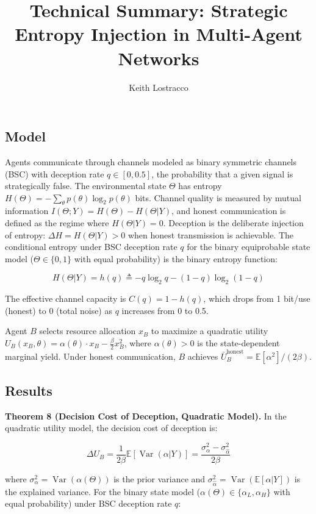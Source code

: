 \documentclass[11pt]{article}
\title{Technical Summary: Strategic Entropy Injection in Multi-Agent
Networks}
\author{Keith Lostracco}
\date{}
\begin{document}
\maketitle

\subsection{Model}\label{model}

Agents communicate through channels modeled as binary symmetric channels
(BSC) with deception rate \(q \in [0, 0.5]\), the probability that a
given signal is strategically false. The environmental state \(\Theta\)
has entropy \(H(\Theta) = -\sum_{\theta} p(\theta) \log_2 p(\theta)\)
bits. Channel quality is measured by mutual information
\(I(\Theta; Y) = H(\Theta) - H(\Theta | Y)\), and honest communication
is defined as the regime where \(H(\Theta | Y) = 0\). Deception is the
deliberate injection of entropy: \(\Delta H = H(\Theta | Y) > 0\) when
honest transmission is achievable. The conditional entropy under BSC
deception rate \(q\) for the binary equiprobable state model
(\(\Theta \in \{0,1\}\) with equal probability) is the binary entropy
function:

\[H(\Theta | Y) = h(q) \triangleq -q \log_2 q - (1 - q) \log_2(1 - q)\]

The effective channel capacity is \(C(q) = 1 - h(q)\), which drops from
1 bit/use (honest) to 0 (total noise) as \(q\) increases from 0 to 0.5.

Agent \(B\) selects resource allocation \(x_B\) to maximize a quadratic
utility
\(U_B(x_B, \theta) = \alpha(\theta) \cdot x_B - \frac{\beta}{2} x_B^2\),
where \(\alpha(\theta) > 0\) is the state-dependent marginal yield.
Under honest communication, \(B\) achieves
\(\bar{U}_B^{\text{honest}} = \mathbb{E}[\alpha^2] / (2\beta)\).

\subsection{Results}\label{results}

\textbf{Theorem 8 (Decision Cost of Deception, Quadratic Model).} In the
quadratic utility model, the decision cost of deception is:

\[\Delta U_B = \frac{1}{2\beta}\mathbb{E}\left[\operatorname{Var}(\alpha | Y)\right] = \frac{\sigma_\alpha^2 - \sigma_{\hat{\alpha}}^2}{2\beta}\]

where \(\sigma_\alpha^2 = \operatorname{Var}(\alpha(\Theta))\) is the
prior variance and
\(\sigma_{\hat{\alpha}}^2 = \operatorname{Var}(\mathbb{E}[\alpha | Y])\)
is the explained variance. For the binary state model
(\(\alpha(\Theta) \in \{\alpha_L, \alpha_H\}\) with equal probability)
under BSC deception rate \(q\):
\end{document}
